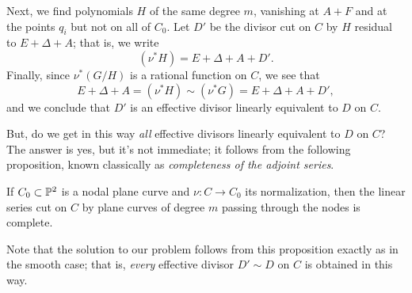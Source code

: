 Next, we find polynomials $H$ of the same degree $m$, vanishing at $A+F$ and at the points $q_i$  but not on all of $C_0$. Let $D'$ be the divisor cut on $C$ by $H$ residual to $E + \Delta + A$; that is, we write
$$
(\nu^*H) = E + \Delta + A + D'.
$$
Finally, since $\nu^*(G/H)$ is a rational function on $C$, we see that 
$$
E + \Delta + A = (\nu^*H) \sim (\nu^*G) = E + \Delta + A + D',
$$
and we conclude that $D'$ is an effective divisor linearly equivalent to $D$ on $C$.

But, do we get in this way \emph{all} effective divisors linearly equivalent to $D$ on $C$? The answer is yes, but it's not immediate; it follows from the following proposition, known classically as \emph{completeness of the adjoint series}.

\begin{proposition}\label{adjoint completeness}
If $C_0 \subset {\mathbb P}^2$ is a nodal plane curve and $\nu : C \to C_0$ its normalization, then the linear series cut on $C$ by plane curves of degree $m$ passing through the nodes is complete.
\end{proposition}

Note  that the solution to our problem follows from this proposition exactly as in the smooth case; that is, \emph{every} effective divisor $D' \sim D$ on $C$ is obtained in this way.

